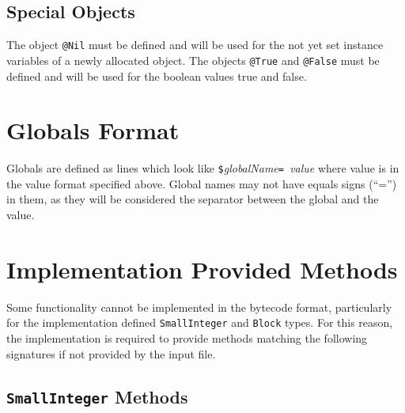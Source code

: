 \documentclass[letterpaper,12pt]{article}
\makeatletter
\newcommand{\code}[1]{\texttt{#1}}
\renewcommand{\arg}[1]{\textit{#1}}
\newcommand{\sblk}{\code{\#}}
\newcommand{\sobj}{\code{@}}
\newcommand{\sglb}{\code{\$}}
\makeatother
\begin{document}
{{{{\subsection{Special Objects}

The object \sobj\code{Nil} must be defined and will be used for the
not yet set instance variables of a newly allocated object.
The objects \sobj\code{True} and \sobj\code{False} must be defined and
will be used for the boolean values true and false.

\section{Globals Format}

Globals are defined as lines which look like
\hbox{\sglb\arg{globalName}\code{= }\arg{value}} where value is
in the value format specified above. Global names may not have equals signs
(``='') in them, as they will be considered the separator between the global
and the value.

\section{Implementation Provided Methods}

Some functionality cannot be implemented in the bytecode format, particularly
for the implementation defined \code{SmallInteger} and \code{Block} types.
For this reason, the implementation is required to provide methods
matching the following signatures if not provided by the input file.

\newcommand{\methodsection}[2]
{
\vbox{
    \subsubsection{\sblk\code{#1}}\label{s:#1}
    #2
    }
}

\newcommand{\methsectitle}[1]{\nopagebreak\noindent\textbf{#1: }}
\newcommand{\methpart}[2]{\methsectitle{#1}#2 \\}

\newcommand{\metharg}[1]{\methpart{Arguments}{#1}}
\newcommand{\methret}[1]{\methpart{Returns}{#1}}
\newcommand{\methdesc}[1]{\methpart{Description}{#1}}
\newcommand{\methreq}[1]{\methpart{Requires}{#1}}

\newcommand{\methnoarg}{\metharg{None}}
\newcommand{\methnoret}{\methret{self}}
\newcommand{\methnoreq}{\methreq{None}}


\subsection{\code{SmallInteger} Methods}

}}}}
\end{document}
